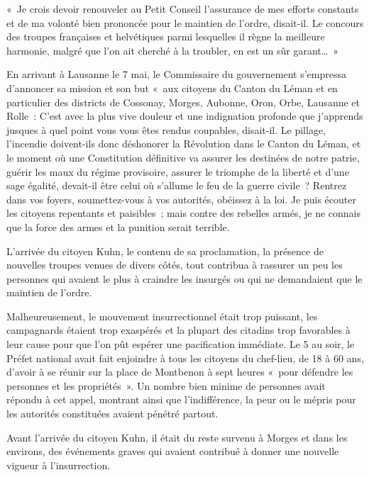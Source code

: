 \documentclass[french,twoside]{book} %
\newenvironment{quoteblock}%
  {\begin{quoting}}
  {\end{quoting}}
\newenvironment{quotebar}{%
    \def\FrameCommand{{\color{rubric!10!}\vrule width 0.5em} \hspace{0.9em}}%
    \def\OuterFrameSep{\itemsep} %
    \MakeFramed {\advance\hsize-\width \FrameRestore}
  }%
  {%
    \endMakeFramed
  }
\renewenvironment{quoteblock}%
  {%
    \savenotes
    \setstretch{0.9}
    \normalfont
    \begin{quotebar}
  }
  {%
    \end{quotebar}
    \spewnotes
  }
\begin{document}
\begin{quoteblock}
 \noindent « Je crois devoir renouveler au Petit Conseil l’assurance de mes efforts constants et de ma volonté bien prononcée pour le maintien de l’ordre, disait-il. Le concours des troupes françaises et helvétiques parmi lesquelles il règne la meilleure harmonie, malgré que l’on ait cherché à la troubler, en est un sûr garant… »
 \end{quoteblock}

\noindent En arrivant à Lausanne le 7 mai, le Commissaire du gouvernement s’empressa d’annoncer sa mission et son but « aux citoyens du Canton du Léman et en particulier des districts de Cossonay, Morges, Aubonne, Oron, Orbe, Lausanne et Rolle : C’est avec la plus vive douleur et une indignation profonde que j’apprends jusques à quel point vous vous êtes rendus coupables, disait-il. Le pillage, l’incendie doivent-ils donc déshonorer la Révolution dans le Canton du Léman, et le moment où une Constitution définitive va assurer les destinées de notre patrie, guérir les maux du régime provisoire, assurer le triomphe de la liberté et d’une sage égalité, devait-il être celui où s’allume le feu de la guerre civile ? Rentrez dans vos foyers, soumettez-vous à vos autorités, obéissez à la loi. Je puis écouter les citoyens repentants et paisibles ; mais contre des rebelles armés, je ne connais que la force des armes et la punition serait terrible.\par
L’arrivée du citoyen Kuhn, le contenu de sa proclamation, la présence de nouvelles troupes venues de divers côtés, tout contribua à rassurer un peu les personnes qui avaient le plus à craindre les insurgés ou qui ne demandaient que le maintien de l’ordre.\par
Malheureusement, le mouvement insurrectionnel était trop puissant, les campagnards étaient trop exaspérés et la plupart des citadins trop favorables à leur cause pour que l’on pût espérer une pacification immédiate. Le 5 au soir, le Préfet national avait fait enjoindre à tous les citoyens du chef-lieu, de 18 à 60 ans, d’avoir à se réunir sur la place de Montbenon à sept heures « pour défendre les personnes et les propriétés ». Un nombre bien minime de personnes avait répondu à cet appel, montrant ainsi que l’indifférence, la peur ou le mépris pour les autorités constituées avaient pénétré partout.\par
Avant l’arrivée du citoyen Kuhn, il était du reste survenu à Morges et dans les environs, des événements graves qui avaient contribué à donner une nouvelle vigueur à l’insurrection.
\end{document}
